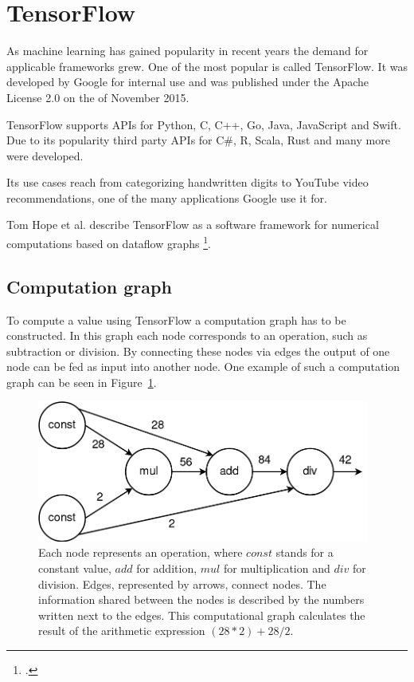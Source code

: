 \newpage

\section{TensorFlow}
As machine learning has gained popularity in recent years the demand for applicable frameworks grew. One of the most popular is called TensorFlow. It was developed by Google for internal use and was published under the Apache License 2.0 on the  of November 2015.

TensorFlow supports APIs for Python, C, C++, Go, Java, JavaScript and Swift.
Due to its popularity third party APIs for C\#, R, Scala, Rust and many more were developed.

Its use cases reach from categorizing handwritten digits to YouTube video recommendations, one of the many applications Google use it for.

Tom Hope et al. describe TensorFlow as a software framework for numerical computations based on dataflow graphs \footcite[page 6]{Hope_Learning_TensorFlow}.

\subsection{Computation graph}
To compute a value using TensorFlow a computation graph has to be constructed. In this graph each node corresponds to an operation, such as subtraction or division. By connecting these nodes via edges the output of one node can be fed as input into another node. One example of such a computation graph can be seen in Figure~\ref{pic:methodology_tensorflow_computationGraph}.

\begin{figure}[h!]
	\centering
	\includegraphics[width=4.3in]{img/methodology_tensorflow_computationGraph.png}
	\caption{Each node represents an operation, where $const$ stands for a constant value, $add$ for addition, $mul$ for multiplication and $div$ for division. Edges, represented by arrows, connect nodes. The information shared between the nodes is described by the numbers written next to the edges. This computational graph calculates the result of the arithmetic expression $(28 * 2) + 28 / 2$.}
	\label{pic:methodology_tensorflow_computationGraph}
\end{figure}


